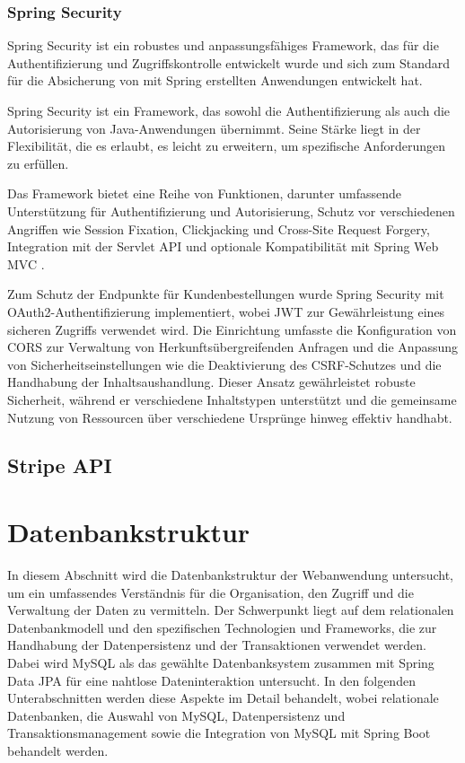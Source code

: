 \subsubsection{Spring Security}

Spring Security ist ein robustes und anpassungsfähiges Framework, das für die Authentifizierung und Zugriffskontrolle entwickelt wurde und sich zum Standard für die Absicherung von mit Spring erstellten Anwendungen entwickelt hat.

Spring Security ist ein Framework, das sowohl die Authentifizierung als auch die Autorisierung von Java-Anwendungen übernimmt. Seine Stärke liegt in der Flexibilität, die es erlaubt, es leicht zu erweitern, um spezifische Anforderungen zu erfüllen.

Das Framework bietet eine Reihe von Funktionen, darunter umfassende Unterstützung für Authentifizierung und Autorisierung, Schutz vor verschiedenen Angriffen wie Session Fixation, Clickjacking und Cross-Site Request Forgery, Integration mit der Servlet API und optionale Kompatibilität mit Spring Web MVC \cite{Spring-Security:o.J}.

Zum Schutz der Endpunkte für Kundenbestellungen wurde Spring Security mit OAuth2-Authentifizierung implementiert, wobei JWT zur Gewährleistung eines sicheren Zugriffs verwendet wird. Die Einrichtung umfasste die Konfiguration von CORS zur Verwaltung von Herkunftsübergreifenden Anfragen und die Anpassung von Sicherheitseinstellungen wie die Deaktivierung des CSRF-Schutzes und die Handhabung der Inhaltsaushandlung. Dieser Ansatz gewährleistet robuste Sicherheit, während er verschiedene Inhaltstypen unterstützt und die gemeinsame Nutzung von Ressourcen über verschiedene Ursprünge hinweg effektiv handhabt.

\subsection{Stripe API}

\section{Datenbankstruktur}
In diesem Abschnitt wird die Datenbankstruktur der Webanwendung untersucht, um ein umfassendes Verständnis für die Organisation, den Zugriff und die Verwaltung der Daten zu vermitteln. Der Schwerpunkt liegt auf dem relationalen Datenbankmodell und den spezifischen Technologien und Frameworks, die zur Handhabung der Datenpersistenz und der Transaktionen verwendet werden. Dabei wird MySQL als das gewählte Datenbanksystem zusammen mit Spring Data JPA für eine nahtlose Dateninteraktion untersucht. In den folgenden Unterabschnitten werden diese Aspekte im Detail behandelt, wobei relationale Datenbanken, die Auswahl von MySQL, Datenpersistenz und Transaktionsmanagement sowie die Integration von MySQL mit Spring Boot behandelt werden.
